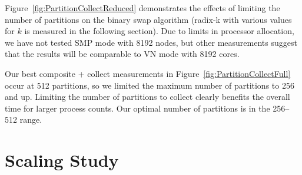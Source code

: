 \documentclass{sig-alternate}
\begin{document}
Figure~\ref{fig:PartitionCollectReduced} demonstrates the effects of
limiting the number of partitions on the binary swap algorithm (radix-k
with various values for $k$ is measured in the following section).  Due to
limits in processor allocation, we have not tested SMP mode with 8192
nodes, but other measurements suggest that the results will be comparable
to VN mode with 8192 cores.

Our best composite + collect measurements in
Figure~\ref{fig:PartitionCollectFull} occur at 512 partitions, so we
limited the maximum number of partitions to 256 and up.  Limiting the
number of partitions to collect clearly benefits the overall time for
larger process counts.  Our optimal number of partitions is in the 256--512
range.

\section{Scaling Study}
\label{sec:Scaling}
\end{document}
